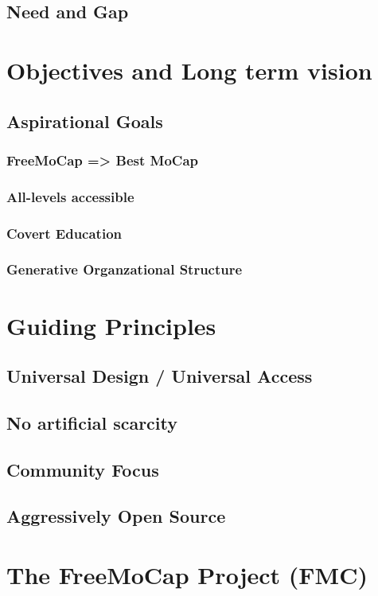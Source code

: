 \documentclass[11pt]{article}
\begin{document}
\subsection{Need and Gap}

\section{Objectives and Long term vision}
\subsection{Aspirational Goals}
\subsubsection{FreeMoCap => Best MoCap}
\subsubsection{All-levels accessible}
\subsubsection{Covert Education}
\subsubsection{Generative Organzational Structure}


\section{Guiding Principles}
\subsection{Universal Design / Universal Access}
\subsection{No artificial scarcity}
\subsection{Community Focus}
\subsection{Aggressively Open Source}

\section{The FreeMoCap Project (FMC)}
\end{document}
